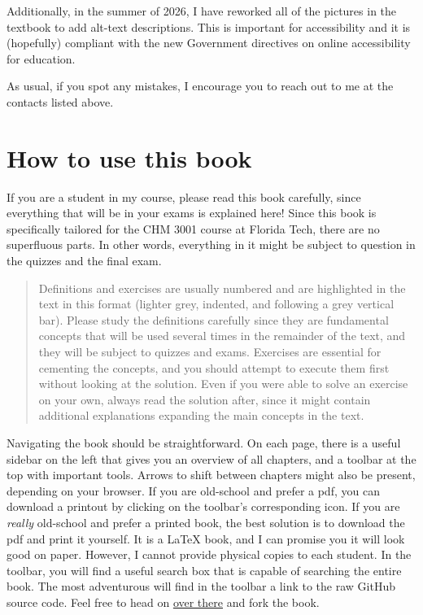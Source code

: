\documentclass[
  9pt,
]{extbook}
\theoremstyle{definition}
\theoremstyle{definition}
\theoremstyle{definition}
\theoremstyle{definition}
\theoremstyle{remark}
\begin{document}
Additionally, in the summer of 2026, I have reworked all of the pictures in the textbook to add alt-text descriptions. This is important for accessibility and it is (hopefully) compliant with the new Government directives on online accessibility for education.

As usual, if you spot any mistakes, I encourage you to reach out to me at the contacts listed above.

\section*{How to use this book}\label{how-to-use-this-book}

If you are a student in my course, please read this book carefully, since everything that will be in your exams is explained here! Since this book is specifically tailored for the CHM 3001 course at Florida Tech, there are no superfluous parts. In other words, everything in it might be subject to question in the quizzes and the final exam.

\begin{quote}
Definitions and exercises are usually numbered and are highlighted in the text in this format (lighter grey, indented, and following a grey vertical bar). Please study the definitions carefully since they are fundamental concepts that will be used several times in the remainder of the text, and they will be subject to quizzes and exams. Exercises are essential for cementing the concepts, and you should attempt to execute them first without looking at the solution. Even if you were able to solve an exercise on your own, always read the solution after, since it might contain additional explanations expanding the main concepts in the text.
\end{quote}

Navigating the book should be straightforward. On each page, there is a useful sidebar on the left that gives you an overview of all chapters, and a toolbar at the top with important tools. Arrows to shift between chapters might also be present, depending on your browser. If you are old-school and prefer a pdf, you can download a printout by clicking on the toolbar's corresponding icon. If you are \emph{really} old-school and prefer a printed book, the best solution is to download the pdf and print it yourself. It is a LaTeX book, and I can promise you it will look good on paper. However, I cannot provide physical copies to each student. In the toolbar, you will find a useful search box that is capable of searching the entire book. The most adventurous will find in the toolbar a link to the raw GitHub source code. Feel free to head on \href{https://github.com/peverati/PChem1}{over there} and fork the book.
\end{document}
